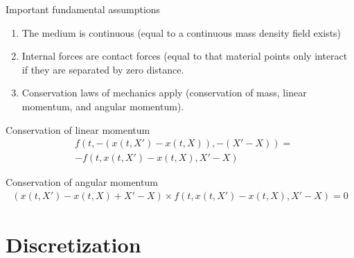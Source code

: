 \documentclass[12pt,t]{beamer}
\begin{document}
\begin{frame}{Important fundamental assumptions}
\begin{enumerate}
\item The medium is continuous (equal to a continuous mass density field exists)
\item Internal forces are contact forces (equal to that material points only interact if they are separated by zero distance.
\item Conservation laws of mechanics apply (conservation of mass, linear momentum, and angular momentum).
\end{enumerate}

\begin{block}{Conservation of linear momentum}
\vspace*{-0.5cm}
\begin{align*}
&f(t,-(x(t,X')-x(t,X)),-(X'-X))= \\ &-f(t,x(t,X')-x(t,X), X'-X)
\end{align*}

\end{block}
\vspace*{-0.5cm}
\begin{block}{Conservation of angular momentum}
\vspace*{-0.5cm}
\begin{align*}
(x(t,X')-x(t,X)+X'-X) \times f\left(t,x(t,X')-x(t,X), X'-X\right) = 0
\end{align*}
\end{block}

\end{frame}

\section{Discretization}
\end{document}
